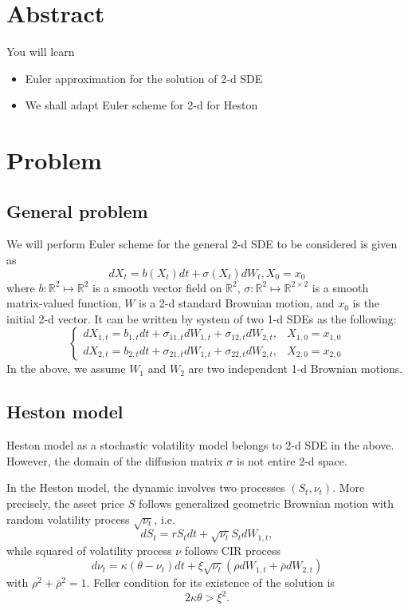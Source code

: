 \documentclass{article}
\begin{document}
\section{Abstract}
You will learn
\begin{itemize}
 \item Euler approximation for the solution of 2-d SDE
 \item We shall adapt Euler scheme for 2-d for Heston
\end{itemize}

\section{Problem}
\subsection{General problem}
We will perform Euler scheme for the general 2-d SDE to be considered is given as
$$d X_{t} = b(X_{t}) dt + \sigma(X_{t}) dW_{t}, X_{0} = x_{0}$$
where $b: \mathbb R^{2} \mapsto \mathbb R^{2}$ is a smooth 
vector field 
on  $\mathbb R^{2}$,
$\sigma: \mathbb R^{2} \mapsto \mathbb R^{2\times 2}$ is a smooth 
matrix-valued function, $W$ is a 2-d standard Brownian motion, 
and $x_{0}$ is the initial 2-d vector. It can be written by system of two 1-d SDEs as the following:
$$
\left\{
\begin{array}
 {ll}
 d X_{1,t} = b_{1,t} dt + \sigma_{11,t}dW_{1,t} + \sigma_{12,t} dW_{2,t}, 
 & X_{1,0} = x_{1,0}\\
 d X_{2,t} = b_{2,t} dt + \sigma_{21,t}dW_{1,t} + \sigma_{22,t} dW_{2,t}, 
 & X_{2,0} = x_{2,0}
\end{array}
\right.
$$
In the above, we assume $W_{1}$ and $W_{2}$ are two independent 1-d Brownian motions.

\subsection{Heston model}
Heston model as a stochastic volatility model belongs to 2-d SDE in the above. However, the domain of the diffusion matrix $\sigma$ is not entire 2-d space. 

In the Heston model, the dynamic involves two processes $(S_{t}, \nu_{t})$.
More precisely, the asset price $S$ follows generalized geometric Brownian motion with random volatility process $\sqrt{\nu_{t}}$, i.e.  
$$d S_{t} = r S_{t} dt + \sqrt{\nu_{t}} S_{t} dW_{1,t},$$
while squared of volatility process $\nu$ follows CIR process
$$ d \nu_{t} = \kappa (\theta - \nu_{t}) dt + \xi \sqrt{\nu_{t}} (\rho dW_{1,t} + 
\bar \rho d W_{2,t})$$
with $\rho^{2} + \bar \rho^{2} = 1.$ Feller condition for its existence of the solution is
$$2\kappa \theta > \xi^{2}.$$
\end{document}
